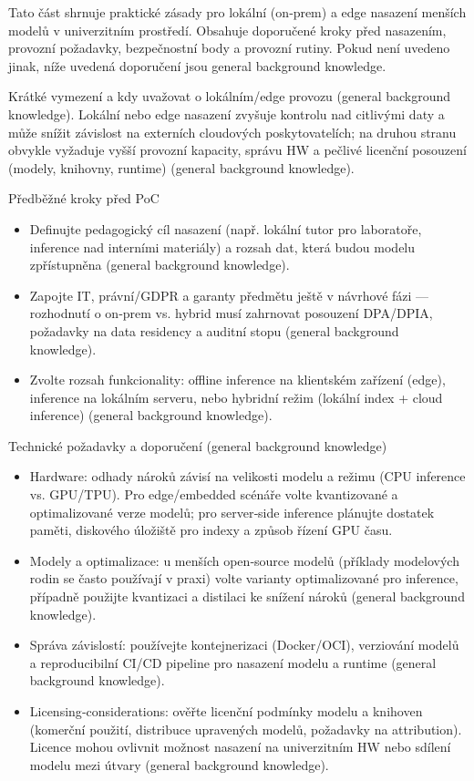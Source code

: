Tato část shrnuje praktické zásady pro lokální (on‑prem) a edge nasazení menších modelů v univerzitním prostředí. Obsahuje doporučené kroky před nasazením, provozní požadavky, bezpečnostní body a provozní rutiny. Pokud není uvedeno jinak, níže uvedená doporučení jsou general background knowledge.

Krátké vymezení a kdy uvažovat o lokálním/edge provozu (general background knowledge).
Lokální nebo edge nasazení zvyšuje kontrolu nad citlivými daty a může snížit závislost na externích cloudových poskytovatelích; na druhou stranu obvykle vyžaduje vyšší provozní kapacity, správu HW a pečlivé licenční posouzení (modely, knihovny, runtime) (general background knowledge).

Předběžné kroky před PoC
\begin{itemize}
  \item Definujte pedagogický cíl nasazení (např. lokální tutor pro laboratoře, inference nad interními materiály) a rozsah dat, která budou modelu zpřístupněna (general background knowledge).
  \item Zapojte IT, právní/GDPR a garanty předmětu ještě v návrhové fázi — rozhodnutí o on‑prem vs. hybrid musí zahrnovat posouzení DPA/DPIA, požadavky na data residency a auditní stopu (general background knowledge).
  \item Zvolte rozsah funkcionality: offline inference na klientském zařízení (edge), inference na lokálním serveru, nebo hybridní režim (lokální index + cloud inference) (general background knowledge).
\end{itemize}

Technické požadavky a doporučení (general background knowledge)
\begin{itemize}
  \item Hardware: odhady nároků závisí na velikosti modelu a režimu (CPU inference vs. GPU/TPU). Pro edge/embedded scénáře volte kvantizované a optimalizované verze modelů; pro server‑side inference plánujte dostatek paměti, diskového úložiště pro indexy a způsob řízení GPU času.
  \item Modely a optimalizace: u menších open‑source modelů (příklady modelových rodin se často používají v praxi) volte varianty optimalizované pro inference, případně použijte kvantizaci a distilaci ke snížení nároků (general background knowledge).
  \item Správa závislostí: používejte kontejnerizaci (Docker/OCI), verziování modelů a reproducibilní CI/CD pipeline pro nasazení modelu a runtime (general background knowledge).
  \item Licensing‑considerations: ověřte licenční podmínky modelu a knihoven (komerční použití, distribuce upravených modelů, požadavky na attribution). Licence mohou ovlivnit možnost nasazení na univerzitním HW nebo sdílení modelu mezi útvary (general background knowledge).
\end{itemize}

